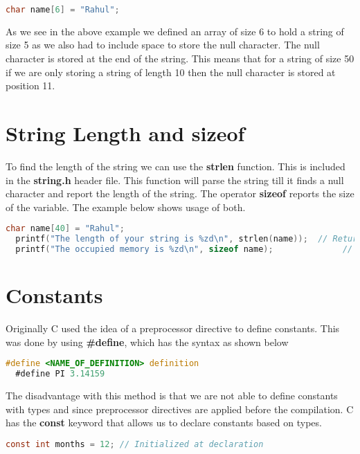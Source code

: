 \documentclass[11pt,a4paper,oneside]{book}
\begin{document}
\begin{lstlisting}[language=C]
  char name[6] = "Rahul";
\end{lstlisting}

\noindent As we see in the above example we defined an array of size 6 to hold a string of size 5 as we
also had to include space to store the null character. The null character is stored at the end of the string.
This means that for a string of size 50 if we are only storing a string of length 10 then the null character
is stored at position 11.

\section{String Length and sizeof}
To find the length of the string we can use the \textbf{strlen} function. This is included in the
\textbf{string.h} header file. This function will parse the string till it finds a null character and report
the length of the string. The operator \textbf{sizeof} reports the size of the variable. The example below
shows usage of both.

\begin{lstlisting}[language=C]
  char name[40] = "Rahul";
  printf("The length of your string is %zd\n", strlen(name));  // Returns 5
  printf("The occupied memory is %zd\n", sizeof name);              // Returns 40
\end{lstlisting}

\section{Constants}
Originally C used the idea of a preprocessor directive to define constants. This was done by using
\textbf{\#define}, which has the syntax as shown below

\begin{lstlisting}[language=C]
  #define <NAME_OF_DEFINITION> definition
  #define PI 3.14159
\end{lstlisting}

\noindent The disadvantage with this method is that we are not able to define constants with types and since
preprocessor directives are applied before the compilation. C has the \textbf{const} keyword that allows us
to declare constants based on types.

\begin{lstlisting}[language=C]
  const int months = 12; // Initialized at declaration
\end{lstlisting}
\end{document}
